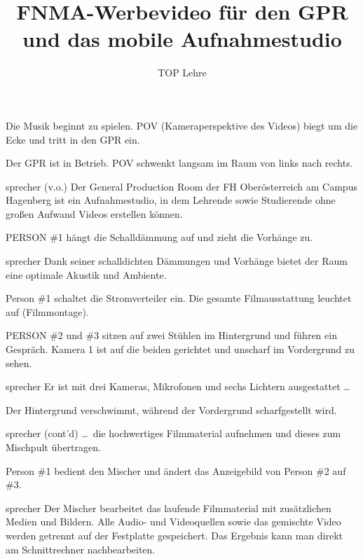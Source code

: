 \documentclass{screenplay}
\title{
	FNMA-Werbevideo für den GPR\\
	und das mobile Aufnahmestudio
}
\author{TOP Lehre}
\begin{document}
	\coverpage
	\fadein
	
	
	Die Musik beginnt zu spielen. POV (Kameraperspektive des Videos) biegt um die Ecke und tritt in den GPR ein.
	
	
	Der GPR ist in Betrieb. POV schwenkt langsam im Raum von links nach rechts.
	
	\begin{dialogue}[nüchtern]{sprecher (v.o.)}
		Der General Production Room der FH Oberösterreich am Campus Hagenberg ist ein Aufnahmestudio, in dem Lehrende sowie Studierende ohne großen Aufwand Videos erstellen können.
	\end{dialogue}
	
	PERSON \#1 hängt die Schalldämmung auf und zieht die Vorhänge zu.
	
	\begin{dialogue}{sprecher}
		Dank seiner schalldichten Dämmungen und Vorhänge bietet der Raum eine optimale Akustik und Ambiente.
	\end{dialogue}
	
	Person \#1 schaltet die Stromverteiler ein. Die gesamte Filmausstattung leuchtet auf (Filmmontage).
	
	PERSON \#2 und \#3 sitzen auf zwei Stühlen im Hintergrund und führen ein Gespräch. Kamera 1 ist auf die beiden gerichtet und unscharf im Vordergrund zu sehen.
	
	\begin{dialogue}{sprecher}
		Er ist mit drei Kameras, Mikrofonen und sechs Lichtern ausgestattet \dots
	\end{dialogue}
	
	Der Hintergrund verschwimmt, während der Vordergrund scharfgestellt wird.
	
	\begin{dialogue}{sprecher (cont'd)}
		\dots~die hochwertiges Filmmaterial aufnehmen und dieses zum Mischpult übertragen.
	\end{dialogue}
	
	Person \#1 bedient den Mischer und ändert das Anzeigebild von Person \#2 auf \#3.
	
	\begin{dialogue}{sprecher}
		Der Mischer bearbeitet das laufende Filmmaterial mit zusätzlichen Medien und Bildern. Alle Audio- und Videoquellen sowie das gemischte Video werden getrennt auf der Festplatte gespeichert. Das Ergebnis kann man direkt am Schnittrechner nachbearbeiten.
	\end{dialogue}
	
\end{document}
